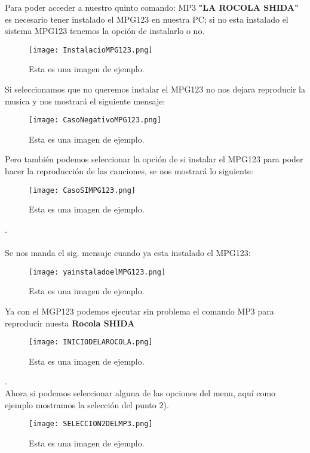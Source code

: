 \documentclass[titlepage]{article}
\begin{document}
Para poder acceder a nuestro quinto comando: MP3 \textbf{"LA ROCOLA SHIDA"} es necesario tener instalado el MPG123 en nuestra PC; si no esta instalado el sistema MPG123 tenemos la opción de instalarlo o no.
\begin{figure}[H]
    \centering
    \texttt{[image: InstalacioMPG123.png]}
    \caption{Esta es una imagen de ejemplo.}
    \label{fig:ejemplo}
\end{figure}
Si seleccionamos que no queremos instalar el MPG123 no nos dejara reproducir la musica y nos mostrará el siguiente mensaje:
\begin{figure}[H]
    \centering
    \texttt{[image: CasoNegativoMPG123.png]}
    \caption{Esta es una imagen de ejemplo.}
    \label{fig:ejemplo}
\end{figure}

Pero también podemos seleccionar la opción de si instalar el MPG123 para poder hacer la reproducción de las canciones, se nos mostrará lo siguiente:
\begin{figure}[H]
    \centering
    \texttt{[image: CasoSIMPG123.png]}
    \caption{Esta es una imagen de ejemplo.}
    \label{fig:ejemplo}
\end{figure}
.\\\\

Se nos manda el sig. mensaje cuando ya esta instalado el MPG123:
\begin{figure}[H]
    \centering
    \texttt{[image: yainstaladoelMPG123.png]}
    \caption{Esta es una imagen de ejemplo.}
    \label{fig:ejemplo}
\end{figure}
Ya con el MGP123 podemos ejecutar sin problema el comando MP3 para reproducir nuesta \textbf{Rocola SHIDA}

\begin{figure}[H]
    \centering
    \texttt{[image: INICIODELAROCOLA.png]}
    \caption{Esta es una imagen de ejemplo.}
    \label{fig:ejemplo}
\end{figure}
.\\
Ahora si podemos seleccionar alguna de las opciones del menu, aquí como ejemplo mostramos la selección del punto 2).
\begin{figure}[H]
    \centering
    \texttt{[image: SELECCION2DELMP3.png]}
    \caption{Esta es una imagen de ejemplo.}
    \label{fig:ejemplo}
\end{figure}
\end{document}
